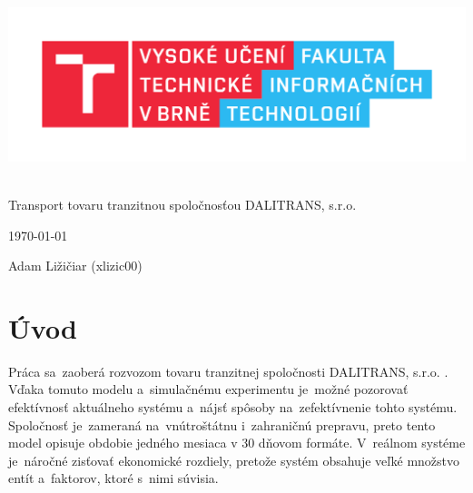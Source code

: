 \documentclass[a4paper, 11pt]{article}
\begin{document}
	\begin{titlepage}
		\begin{center}
			\includegraphics[width=0.77\linewidth]{res/logo_FIT.pdf} \\


			 \\
			\LARGE{Transport tovaru tranzitnou spoločnosťou DALITRANS, s.r.o.} \\
		\end{center}

		\begin{minipage}[b]{0.4 \textwidth}
			\raggedright
			{\Large \today}
		\end{minipage}
		\hfill
		\begin{minipage}[b]{0.6 \textwidth}
			\raggedleft
			\Large
			Adam Ližičiar (xlizic00)\\
		\end{minipage}		
	\end{titlepage}

	\setcounter{page}{1}
	\tableofcontents
	\clearpage

	\setcounter{page}{1}
	
	\section{Úvod}
	Práca sa~zaoberá rozvozom tovaru tranzitnej spoločnosti DALITRANS, s.r.o. .
    Vďaka tomuto modelu a~simulačnému experimentu je~možné pozorovať
    efektívnosť aktuálneho systému a~nájsť spôsoby na~zefektívnenie
    tohto systému. Spoločnosť je~zameraná na~vnútroštátnu i~zahraničnú prepravu,
    preto tento model opisuje obdobie jedného mesiaca v 30 dňovom formáte. \newline
    V~reálnom systéme je~náročné zisťovať ekonomické rozdiely, pretože
    systém obsahuje veľké množstvo entít a~faktorov, ktoré s~nimi súvisia.
\end{document}
